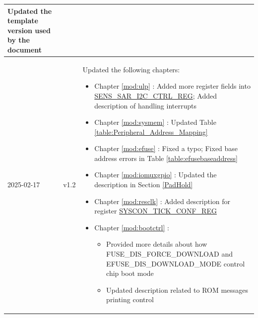 \begin{longtable}[l]{ | m{2cm} | m{1.5cm} | m{12cm} | }
    Updated the template version used by the document
    \\\hline
    2025-02-17 & v1.2 &
    Updated the following chapters:
    \begin{itemize}
        \item Chapter \ref{mod:ulp} \textit{\nameref{mod:ulp}}: Added more register fields into \hyperref[regdesc:SENSSARI2CCTRLREG]{SENS\_SAR\_I2C\_CTRL\_REG}; Added description of handling interrupts
        \item Chapter \ref{mod:sysmem} \textit{\nameref{mod:sysmem}}: Updated Table \ref{table:Peripheral_Address_Mapping} %
        \item Chapter \ref{mod:efuse} \textit{\nameref{mod:efuse}}: Fixed a typo; Fixed base address errors in Table \ref{table:efusebaseaddress} \textit{\nameref{table:efusebaseaddress}} %
        \item Chapter \ref{mod:iomuxgpio} \textit{\nameref{mod:iomuxgpio}}: Updated the description in Section \ref{PadHold} %
        \item Chapter \ref{mod:resclk} \textit{\nameref{mod:resclk}}: Added description for register \hyperref[regdesc:SYSCONTICKCONFREG]{SYSCON\_TICK\_CONF\_REG} %
        \item Chapter \ref{mod:bootctrl} \textit{\nameref{mod:bootctrl}}:
        \begin{itemize}
        \item Provided more details about how FUSE\_DIS\_FORCE\_DOWNLOAD and EFUSE\_DIS\_DOWNLOAD\_MODE control chip boot mode %
        \item Updated description related to ROM messages printing control %
        \end{itemize}


\end{itemize}
\end{longtable}
